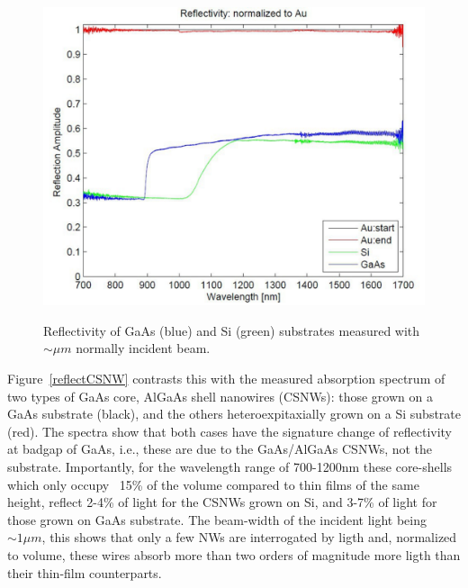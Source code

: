\begin{figure}
  \caption{Reflectivity of GaAs (blue) and Si (green) substrates measured with $\sim{\mu}m$ normally incident beam.}
  \centering
  \includegraphics[width=\textwidth]{pictures/Data/reflecbulk}
  \label{reflecbulk}
\end{figure}

Figure~\ref{reflectCSNW} contrasts this with the measured absorption spectrum
of two types of GaAs core, AlGaAs shell nanowires (CSNWs): those grown on a
GaAs substrate (black), and the others heteroexpitaxially grown on a Si
substrate (red). The spectra show that both cases have the signature change of
reflectivity at badgap of GaAs, i.e., these are due to the GaAs/AlGaAs CSNWs,
not the substrate. Importantly, for the wavelength range of 700-1200nm these
core-shells which only occupy ~15\% of the volume compared to thin films of the
same height, reflect 2-4\% of light for the CSNWs grown on Si, and 3-7\% of
light for those grown on GaAs substrate. The beam-width of the incident light
being $\sim1{\mu}m$, this shows that only a few NWs are interrogated by ligth
and, normalized to volume, these wires absorb more than two orders of magnitude
more ligth than their thin-film counterparts.

